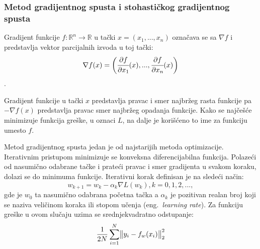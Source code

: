 \subsubsection{Metod gradijentnog spusta i stohastičkog gradijentnog spusta}

Gradijent funkcije $f:\mathbb{R}^n \rightarrow \mathbb{R}$ u tački $x=(x_1, ..., x_n)$ označava se sa $\nabla f$ i predstavlja vektor parcijalnih izvoda u toj tački:
\begin{equation}
\nabla f(x) = \bigg( \cfrac{\partial f}{\partial x_1}(x),...,\cfrac{\partial f}{\partial x_n}(x) \bigg)
\end{equation}.

Gradijent funkcije u tački $x$ predstavlja pravac i smer najbržeg rasta funkcije pa $- \nabla f(x)$ predstavlja pravac smer najbržeg opadanja funkcije. Kako se najčešće minimizuje funkcija greške, u oznaci $L$, na dalje je korišćeno to ime za funkciju umesto $f$.
\par

Metod gradijentnog spusta jedan je od najstarijih metoda  optimizacije. Iterativnim pristupom minimizuje se konveksna diferencijabilna funkcija. Polazeći od nasumično odabrane tačke i prateći pravac i smer gradijenta u svakom koraku, dolazi se do minimuma funkcije. Iterativni korak definisan je na sledeći način:
\begin{equation}
	\label{eq:gradijentni_spust}
	w_{k+1} = w_k - \alpha_k \nabla L(w_k), k=0, 1, 2, ... ,
\end{equation}
gde je $w_0$ ta nasumično odabrana početna tačka a $\alpha_k$ je pozitivan realan broj koji se naziva veličinom koraka ili stopom učenja (eng.~{\em learning rate}). 
Za funkciju greške u ovom slučaju uzima se srednjekvadratno odstupanje:
\begin{equation}
	\frac{1}{2N}\sum_{i=1}^{N} \norm{y_i - f_w(x_i)}_2^2
\end{equation}

